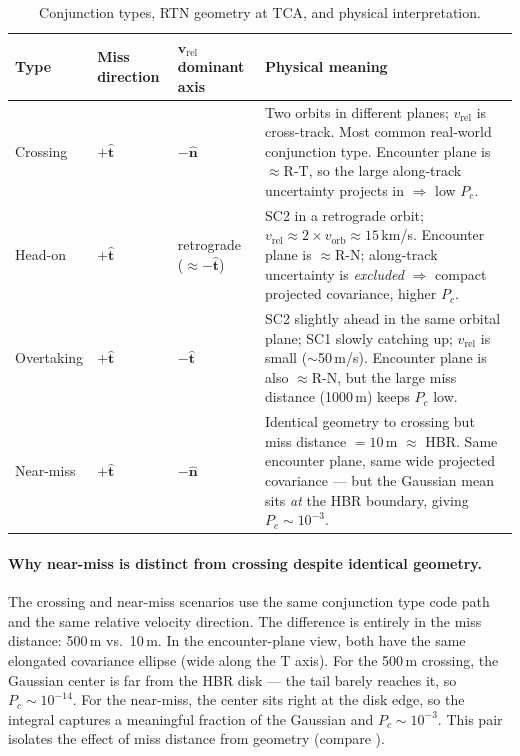 \documentclass[11pt]{article}
\begin{document}
\begin{table}[h]
\centering
\caption{Conjunction types, RTN geometry at TCA, and physical interpretation.}
\label{tab:ctypes}
\begin{tabular}{lllp{5.8cm}}
  \toprule
  Type & Miss direction & $\mathbf{v}_\text{rel}$ dominant axis & Physical meaning \\
  \midrule
  Crossing  & $+\hat{\mathbf{t}}$ & $-\hat{\mathbf{n}}$ &
    Two orbits in different planes; $v_\text{rel}$ is cross-track.
    Most common real-world conjunction type.  Encounter plane is $\approx$R-T,
    so the large along-track uncertainty projects in $\Rightarrow$ low $P_c$. \\[4pt]
  Head-on   & $+\hat{\mathbf{t}}$ & retrograde ($\approx -\hat{\mathbf{t}}$) &
    SC2 in a retrograde orbit; $v_\text{rel} \approx 2 \times v_\text{orb}
    \approx 15$\,km/s.  Encounter plane is $\approx$R-N;
    along-track uncertainty is \emph{excluded} $\Rightarrow$ compact
    projected covariance, higher $P_c$. \\[4pt]
  Overtaking & $+\hat{\mathbf{t}}$ & $-\hat{\mathbf{t}}$ &
    SC2 slightly ahead in the same orbital plane; SC1 slowly catching up;
    $v_\text{rel}$ is small ($\sim$50\,m/s).  Encounter plane is also $\approx$R-N,
    but the large miss distance (1000\,m) keeps $P_c$ low. \\[4pt]
  Near-miss  & $+\hat{\mathbf{t}}$ & $-\hat{\mathbf{n}}$ &
    Identical geometry to crossing but miss distance $= 10$\,m $\approx$ HBR.
    Same encounter plane, same wide projected covariance — but the Gaussian
    mean sits \emph{at} the HBR boundary, giving $P_c \sim 10^{-3}$. \\
  \bottomrule
\end{tabular}
\end{table}

\paragraph{Why near-miss is distinct from crossing despite identical geometry.}
The crossing and near-miss scenarios use the same conjunction type code path and
the same relative velocity direction.  The difference is entirely in the miss
distance: 500\,m vs.\ 10\,m.  In the encounter-plane view, both have the same
elongated covariance ellipse (wide along the T axis).  For the 500\,m crossing,
the Gaussian center is far from the HBR disk — the tail barely reaches it, so
$P_c \sim 10^{-14}$.  For the near-miss, the center sits right at the disk edge,
so the integral captures a meaningful fraction of the Gaussian and $P_c \sim 10^{-3}$.
This pair isolates the effect of miss distance from geometry (compare
).
\end{document}
